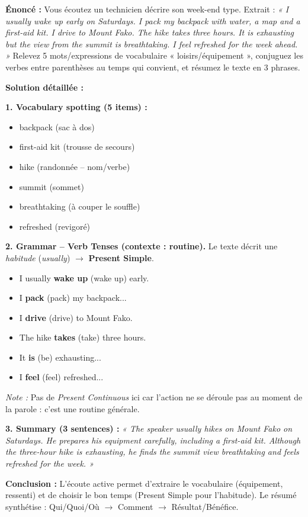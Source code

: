 \documentclass[11pt]{article}
\newcommand{\cle}[1]{{\popxbold\color{popdark}#1}}
\begin{document}
\begin{exoresolu}
\textbf{Énoncé :} Vous écoutez un technicien décrire son week-end type. Extrait : \emph{« I usually wake up early on Saturdays. I pack my backpack with water, a map and a first-aid kit. I drive to Mount Fako. The hike takes three hours. It is exhausting but the view from the summit is breathtaking. I feel refreshed for the week ahead. »}
Relevez 5 mots/expressions de vocabulaire « loisirs/équipement », conjuguez les verbes entre parenthèses au temps qui convient, et résumez le texte en 3 phrases.

\tcblower
\textbf{Solution détaillée :}

\textbf{1. Vocabulary spotting (5 items) :}
\begin{itemize}
    \item \cle{backpack} (sac à dos)
    \item \cle{first-aid kit} (trousse de secours)
    \item \cle{hike} (randonnée -- nom/verbe)
    \item \cle{summit} (sommet)
    \item \cle{breathtaking} (à couper le souffle)
    \item \cle{refreshed} (revigoré)
\end{itemize}

\textbf{2. Grammar -- Verb Tenses (contexte : routine).}
Le texte décrit une \emph{habitude} (\emph{usually}) $\rightarrow$ \textbf{Present Simple}.
\begin{itemize}
    \item I usually \textbf{wake up} (wake up) early.
    \item I \textbf{pack} (pack) my backpack...
    \item I \textbf{drive} (drive) to Mount Fako.
    \item The hike \textbf{takes} (take) three hours.
    \item It \textbf{is} (be) exhausting...
    \item I \textbf{feel} (feel) refreshed...
\end{itemize}
\emph{Note :} Pas de \emph{Present Continuous} ici car l'action ne se déroule pas au moment de la parole : c'est une routine générale.

\textbf{3. Summary (3 sentences) :}
\emph{« The speaker usually hikes on Mount Fako on Saturdays. He prepares his equipment carefully, including a first-aid kit. Although the three-hour hike is exhausting, he finds the summit view breathtaking and feels refreshed for the week. »}

\textbf{Conclusion :} L'écoute active permet d'extraire le vocabulaire (équipement, ressenti) et de choisir le bon temps (Present Simple pour l'habitude). Le résumé synthétise : Qui/Quoi/Où $\rightarrow$ Comment $\rightarrow$ Résultat/Bénéfice.
\end{exoresolu}
\end{document}

